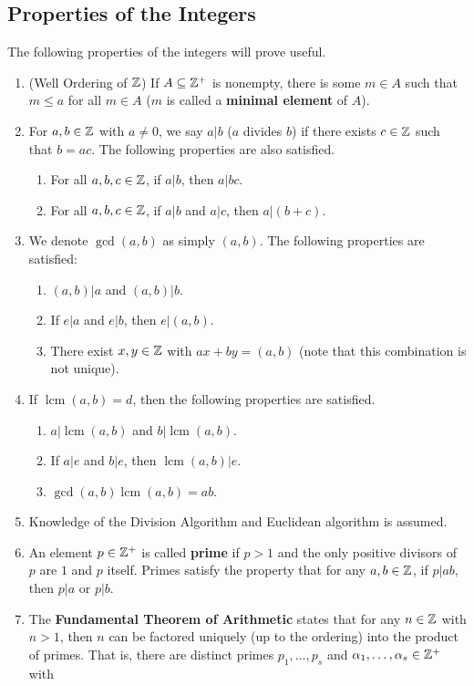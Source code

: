 \documentclass[10pt, oneside]{article}
\begin{document}
\subsection{Properties of the Integers}
The following properties of the integers will prove useful.
\begin{enumerate}
    \item (Well Ordering of $\mathbb{Z}$) If $A\subseteq\mathbb{Z}^+$ is nonempty, there is some $m\in A$ such that $m\le a$ for all $m\in A$ ($m$ is called a \textbf{minimal element} of $A$).
    \item For $a,b\in\mathbb{Z}$ with $a\ne 0$, we say $a|b$ ($a$ divides $b$) if there exists $c\in \mathbb{Z}$ such that $b=ac$. The following properties are also satisfied.
    \begin{enumerate}
        \item For all $a,b,c\in\mathbb{Z}$, if $a|b$, then $a|bc$.
        \item For all $a,b,c\in\mathbb{Z}$, if $a|b$ and $a|c$, then $a|(b+c)$.
    \end{enumerate}
    \item We denote $\gcd(a,b)$ as simply $(a,b)$. The following properties are satisfied:
    \begin{enumerate}
        \item $(a,b)|a$ and $(a,b)|b$.
        \item If $e|a$ and $e|b$, then $e|(a,b)$.
        \item There exist $x,y\in\mathbb{Z}$ with $ax+by = (a,b)$ (note that this combination is not unique).
    \end{enumerate}
    \item If $\operatorname{lcm}(a,b) = d$, then the following properties are satisfied.
    \begin{enumerate}
        \item $a|\operatorname{lcm}(a,b)$ and $b|\operatorname{lcm}(a,b)$. 
        \item If $a|e$ and $b|e$, then $\operatorname{lcm}(a,b)|e$.
        \item $\gcd(a,b)\operatorname{lcm}(a,b) = ab$.  
    \end{enumerate}
    \item Knowledge of the Division Algorithm and Euclidean algorithm is assumed. 
    \item An element $p\in\mathbb{Z}^+$ is called \textbf{prime} if $p>1$ and the only positive divisors of $p$ are $1$ and $p$ itself. Primes satisfy the property that for any $a,b\in\mathbb{Z}$, if $p|ab$, then $p|a$ or $p|b$.
    \item The \textbf{Fundamental Theorem of Arithmetic} states that for any $n\in\mathbb{Z}$ with $n>1$, then $n$ can be factored uniquely (up to the ordering) into the product of primes. That is, there are distinct primes $p_1, \dots, p_s$ and $\alpha_1,\dots, \alpha_s\in \mathbb{Z}^+$ with

\end{enumerate}
\end{document}
